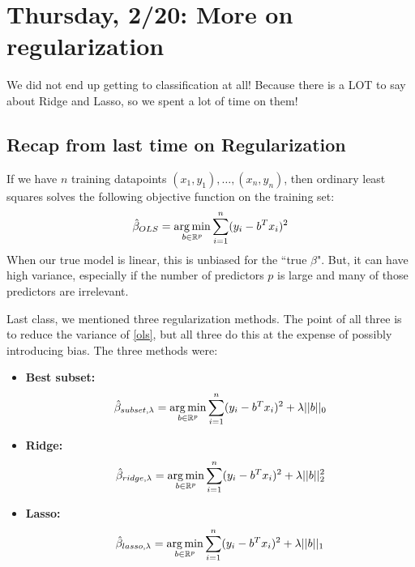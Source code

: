 \section{Thursday, 2/20: More on regularization}

We did not end up getting to classification at all! Because there is a LOT to say about Ridge and Lasso, so we spent a lot of time on them! 

\subsection{Recap from last time on Regularization}

If we have $n$ training datapoints $(x_1, y_1), \ldots, (x_n, y_n)$, then ordinary least squares solves the following objective function on the training set:
\begin{equation}
\label{ols}
\hat{\beta}_{OLS} = \mathop{\mathrm{arg\,min}}_{b \in \mathbb{R}^p} \sum_{i=1}^n 	(y_i - b^T x_i)^2
\end{equation}
When our true model is linear, this is unbiased for the ``true $\beta$". But, it can have high variance, especially if the number of predictors $p$ is large and many of those predictors are irrelevant. 

Last class, we mentioned three regularization methods. The point of all three is to reduce the variance of \eqref{ols}, but all three do this at the expense of possibly introducing bias. The three methods were:

\begin{itemize}
\item \textbf{Best subset:} 
\begin{equation}
\label{subset}
\hat{\beta}_{subset,\lambda} = \mathop{\mathrm{arg\,min}}_{b \in \mathbb{R}^p} \sum_{i=1}^n 	(y_i - b^T x_i)^2 + \lambda ||b||_0
\end{equation}
\item \textbf{Ridge: }
\begin{equation}
\label{ridge}
\hat{\beta}_{ridge,\lambda} = \mathop{\mathrm{arg\,min}}_{b \in \mathbb{R}^p} \sum_{i=1}^n 	(y_i - b^T x_i)^2 + \lambda ||b||_2^2
\end{equation}
\item \textbf{Lasso: }	
\begin{equation}
\label{lasso}
\hat{\beta}_{lasso,\lambda} = \mathop{\mathrm{arg\,min}}_{b \in \mathbb{R}^p} \sum_{i=1}^n 	(y_i - b^T x_i)^2 + \lambda ||b||_1
\end{equation}
\end{itemize}

